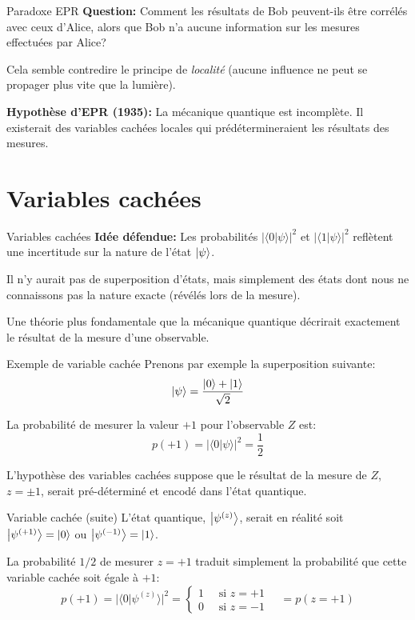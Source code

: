 \documentclass[aspectratio=169,12pt]{beamer}
\begin{document}
\begin{frame}{Paradoxe EPR}
  \textbf{Question:} Comment les résultats de Bob peuvent-ils être corrélés avec ceux d'Alice, alors que Bob n'a aucune information sur les mesures effectuées par Alice?
  
  \bigskip
  Cela semble contredire le principe de \textit{localité} (aucune influence ne peut se propager plus vite que la lumière).

  \bigskip
  \textbf{Hypothèse d'EPR (1935):} La mécanique quantique est incomplète. Il existerait des variables cachées locales qui prédétermineraient les résultats des mesures.
\end{frame}

\section{Variables cachées}

\begin{frame}{Variables cachées}
  \textbf{Idée défendue:} Les probabilités $|\langle 0 | \psi \rangle|^2$ et $|\langle 1 | \psi \rangle|^2$ reflètent une incertitude sur la nature de l'état $\ket\psi$.
  
  \bigskip
  Il n'y aurait pas de superposition d'états, mais simplement des états dont nous ne connaissons pas la nature exacte (révélés lors de la mesure).
  
  \bigskip
  Une théorie plus fondamentale que la mécanique quantique décrirait exactement le résultat de la mesure d'une observable.
\end{frame}

\begin{frame}{Exemple de variable cachée}
  Prenons par exemple la superposition suivante:
  \[
    \ket\psi = \frac{\ket 0 + \ket 1}{\sqrt{2}}
  \]
  
  La probabilité de mesurer la valeur $+1$ pour l'observable $Z$ est:
  \[
    p(+1) = |\langle 0 | \psi \rangle|^2 = \frac 12
  \]
  
  L'hypothèse des variables cachées suppose que le résultat de la mesure de $Z$, $z = \pm 1$, serait pré-déterminé et encodé dans l'état quantique.
\end{frame}

\begin{frame}{Variable cachée (suite)}
  L'état quantique, $\ket{\psi^{(z)}}$, serait en réalité soit $\ket{\psi^{(+1)}} = \ket 0$ ou $\ket{\psi^{(-1)}} = \ket 1$.
  
  \bigskip
  La probabilité $1/2$ de mesurer $z=+1$ traduit simplement la probabilité que cette variable cachée soit égale à $+1$:
  \[
    p(+1) = |\langle 0 | \psi^{(z)} \rangle|^2 = 
    \begin{cases}
        1 \quad \text{ si } z=+1 \\
        0 \quad \text{ si } z=-1
    \end{cases}
    \quad
    = p(z=+1)
  \]
\end{frame}
\end{document}
